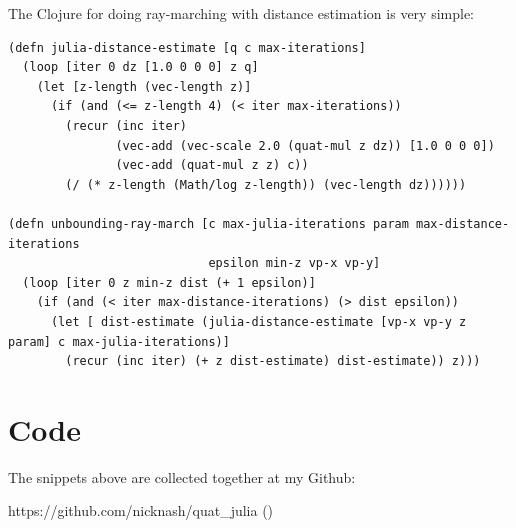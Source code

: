 \documentclass[11pt]{article}
\begin{document}
The Clojure for doing ray-marching with distance estimation is very simple:

\begin{lstlisting}
(defn julia-distance-estimate [q c max-iterations]
  (loop [iter 0 dz [1.0 0 0 0] z q]
    (let [z-length (vec-length z)]     
      (if (and (<= z-length 4) (< iter max-iterations))
        (recur (inc iter) 
               (vec-add (vec-scale 2.0 (quat-mul z dz)) [1.0 0 0 0])
               (vec-add (quat-mul z z) c))
        (/ (* z-length (Math/log z-length)) (vec-length dz))))))

(defn unbounding-ray-march [c max-julia-iterations param max-distance-iterations
                            epsilon min-z vp-x vp-y]
  (loop [iter 0 z min-z dist (+ 1 epsilon)]
    (if (and (< iter max-distance-iterations) (> dist epsilon))
      (let [ dist-estimate (julia-distance-estimate [vp-x vp-y z param] c max-julia-iterations)]
        (recur (inc iter) (+ z dist-estimate) dist-estimate)) z)))
\end{lstlisting}

\section{Code}

The snippets above are collected together at my Github:

https://github.com/nicknash/quat\_julia (\texttt{})
\end{document}
